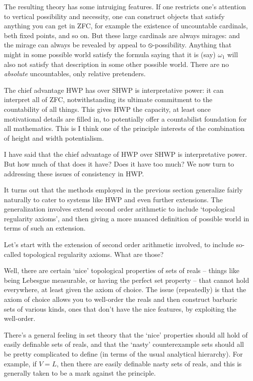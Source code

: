 \documentclass{article}
\begin{document}
The resulting theory has some intruiging features. If one restricts one's attention 
to vertical possibility and necessity, one can construct objects that 
satisfy anything you can get in ZFC, for example the existence of uncountable cardinals, 
beth fixed points, and so on. But these large cardinals are always mirages: 
and the mirage can always be revealed 
by appeal to $\circledbslash$-possibility. Anything that might in some possible world 
satisfy the formula saying that it is (say) $\omega_1$ will also not satisfy that 
description in some other possible world. There are no \emph{absolute} uncountables, only 
relative pretenders.

The chief advantage HWP has over SHWP is interpretative power: it can interpret all 
of ZFC, notwithstanding its ultimate commitment to the countability of all things.
This gives HWP the capacity, at least once motivational details are filled in,
to potentially offer a countabilist foundation for all mathematics. This is I think
one of the principle interests of the combination of height and width potentialism.

I have said that the chief advantage of HWP over SHWP is interpretative power. But 
how much of that does it have? Does it have too much? We now turn to addressing 
these issues of consistency in HWP.

It turns out that the methods employed in the previous section generalize fairly 
naturally to cater to systems like HWP and even further extensions. The generalization
involves extend second order arithmetic to include `topological regularity axioms',
and then giving a more nuanced definition of possible world in terms of such an extension.

Let's start with the extension of second order arithmetic involved, 
to include so-called topological regularity axioms. 
What are those?

Well, there are certain `nice' topological properties of sets of reals -- 
things like being Lebesgue measurable, or having the perfect set property -- 
that cannot hold everywhere, at least given the axiom of choice. The issue (repeatedly)
is that the axiom of choice allows you to well-order the reals and then construct
barbaric sets of various kinds, ones that don't have the nice features, by exploiting 
the well-order. 

There's a general feeling in set theory that the `nice' properties should all 
hold of easily definable sets of reals, and that the `nasty' counterexample sets 
should all be pretty complicated to define (in terms of the usual analytical hierarchy).
For example, if $V = L$, then there are easily definable nasty sets of reals, and 
this is generally taken to be a mark against the principle.
\end{document}
